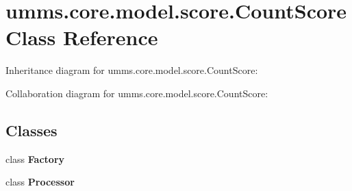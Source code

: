 \hypertarget{classumms_1_1core_1_1model_1_1score_1_1_count_score}{\section{umms.\+core.\+model.\+score.\+Count\+Score Class Reference}
\label{classumms_1_1core_1_1model_1_1score_1_1_count_score}
}


Inheritance diagram for umms.\+core.\+model.\+score.\+Count\+Score\+:


Collaboration diagram for umms.\+core.\+model.\+score.\+Count\+Score\+:
\subsection*{Classes}
\begin{DoxyCompactItemize}
\item 
class {\bfseries Factory}
\item 
class {\bfseries Processor}
\end{DoxyCompactItemize}
